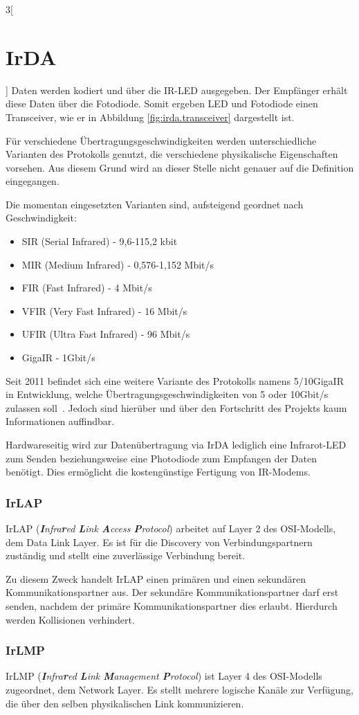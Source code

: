 \begin{multicols}{3}[\section{IrDA}]
Daten werden kodiert und über die IR-LED ausgegeben. Der Empfänger erhält diese Daten über die Fotodiode. Somit ergeben LED und Fotodiode einen Transceiver, wie er in Abbildung \ref{fig:irda.transceiver} dargestellt ist.

Für verschiedene Übertragungsgeschwindigkeiten werden unterschiedliche Varianten des Protokolls genutzt, die verschiedene physikalische Eigenschaften vorsehen. Aus diesem Grund wird an dieser Stelle nicht genauer auf die Definition eingegangen.

Die momentan eingesetzten Varianten sind, aufsteigend geordnet nach Geschwindigkeit:

\begin{itemize}
	\item SIR (Serial Infrared) - 9,6-115,2 kbit
	\item MIR (Medium Infrared) - 0,576-1,152 Mbit/s
	\item FIR (Fast Infrared) - 4 Mbit/s
	\item VFIR (Very Fast Infrared) - 16 Mbit/s
	\item UFIR (Ultra Fast Infrared) - 96 Mbit/s
	\item GigaIR - 1Gbit/s~\cite{wikipediaen}
\end{itemize}

Seit 2011 befindet sich eine weitere Variante des Protokolls namens 5/10GigaIR in Entwicklung, welche Übertragungsgeschwindigkeiten von 5 oder 10Gbit/s zulassen soll~\cite{irdagiga}. Jedoch sind hierüber und über den Fortschritt des Projekts kaum Informationen auffindbar.

Hardwareseitig wird zur Datenübertragung via IrDA lediglich eine Infrarot-LED zum Senden beziehungsweise eine Photodiode zum Empfangen der Daten benötigt. Dies ermöglicht die kostengünstige Fertigung von IR-Modems.
\subsubsection*{IrLAP}
IrLAP (\textit{\textbf{I}nfra\textbf{r}ed \textbf{L}ink \textbf{A}ccess \textbf{P}rotocol}) arbeitet auf Layer 2 des OSI-Modells, dem Data Link Layer. Es ist für die Discovery von Verbindungspartnern zuständig und stellt eine zuverlässige Verbindung bereit.

Zu diesem Zweck handelt IrLAP einen primären und einen sekundären Kommunikationspartner aus. Der sekundäre Kommunikationspartner darf erst senden, nachdem der primäre Kommunikationspartner dies erlaubt. Hierdurch werden Kollisionen verhindert.
\subsubsection*{IrLMP}
IrLMP (\textit{\textbf{I}nfra\textbf{r}ed \textbf{L}ink \textbf{M}anagement \textbf{P}rotocol}) ist Layer 4 des OSI-Modells zugeordnet, dem Network Layer. Es stellt mehrere logische Kanäle zur Verfügung, die über den selben physikalischen Link kommunizieren.

\end{multicols}
